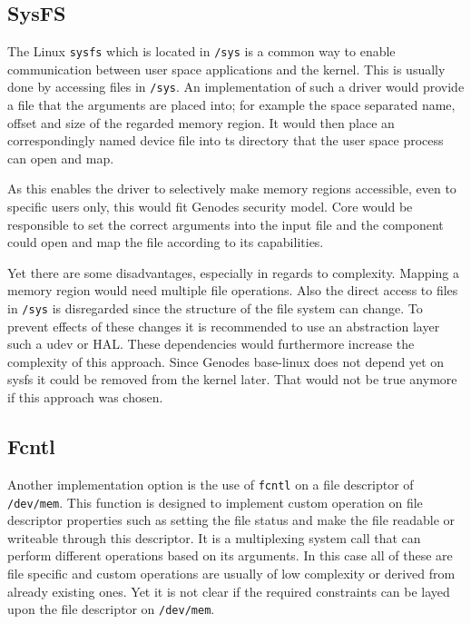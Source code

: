 \documentclass[
a4paper,
12pt,
notitlepage,
parskip=half,
DIV=11,
]{scrbook}
\begin{document}
		\subsection{SysFS}
		
		The Linux \texttt{sysfs} which is located in \texttt{/sys} is a common way to enable communication between user space applications and the kernel.
		This is usually done by accessing files in \texttt{/sys}.
		An implementation of such a driver would provide a file that the arguments are placed into; for example the space separated name, offset and size of the regarded memory region.
		It would then place an correspondingly named device file into ts directory that the user space process can open and map. \citep{sysfs}
		
		As this enables the driver to selectively make memory regions accessible, even to specific users only, this would fit Genodes security model.
		Core would be responsible to set the correct arguments into the input file and the component could open and map the file according to its capabilities.
		
		Yet there are some disadvantages, especially in regards to complexity.
		Mapping a memory region would need multiple file operations.
		Also the direct access to files in \texttt{/sys} is disregarded since the structure of the file system can change.
		To prevent effects of these changes it is recommended to use an abstraction layer such a udev or HAL.
		These dependencies would furthermore increase the complexity of this approach.
		Since Genodes base-linux does not depend yet on sysfs it could be removed from the kernel later.
		That would not be true anymore if this approach was chosen. \citep{sysfs}
		
		\subsection{Fcntl}
		
		Another implementation option is the use of \texttt{fcntl} on a file descriptor of \texttt{/dev/mem}.
		This function is designed to implement custom operation on file descriptor properties such as setting the file status and make the file readable or writeable through this descriptor.
		It is a multiplexing system call that can perform different operations based on its arguments.
		In this case all of these are file specific and custom operations are usually of low complexity or derived from already existing ones.
		Yet it is not clear if the required constraints can be layed upon the file descriptor on \texttt{/dev/mem}. \citep{syscall} \citep{fcntl}
		
\end{document}
